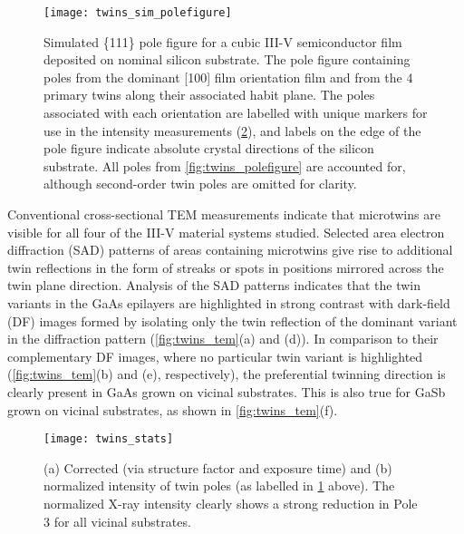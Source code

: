 \begin{figure}
    \centering
    \texttt{[image: twins\_sim\_polefigure]}
    \caption[Simulated pole figure of twinned III-V on nominal silicon]{\label{fig:twins_sim_polefigure}Simulated \{111\} pole figure for a cubic III-V semiconductor film deposited on nominal silicon substrate. The pole figure containing poles from the dominant [100] film orientation film and from the 4 primary twins along their associated habit plane. The poles associated with each orientation are labelled with unique markers for use in the intensity measurements (\cref{fig:twins_stats}), and labels on the edge of the pole figure indicate absolute crystal directions of the silicon substrate. All poles from \cref{fig:twins_polefigure} are accounted for, although second-order twin poles are omitted for clarity.}
\end{figure}
Conventional cross-sectional TEM measurements indicate that microtwins are visible for all four of the III-V material systems studied. Selected area electron diffraction (SAD) patterns of areas containing microtwins give rise to additional twin reflections in the form of streaks or spots in positions mirrored across the twin plane direction. Analysis of the SAD patterns indicates that the twin variants in the GaAs epilayers are highlighted in strong contrast with dark-field (DF) images formed by isolating only the twin reflection of the dominant variant in the diffraction pattern (\cref{fig:twins_tem}(a) and (d)). In comparison to their complementary DF images, where no particular twin variant is highlighted (\cref{fig:twins_tem}(b) and (e), respectively), the preferential twinning direction is clearly present in GaAs grown on vicinal substrates. This is also true for GaSb grown on vicinal substrates, as shown in \cref{fig:twins_tem}(f).
\begin{figure}
    \centering
    \texttt{[image: twins\_stats]}
    \caption[Integrated x-ray intensities from pole figures]{\label{fig:twins_stats}(a) Corrected (via structure factor and exposure time) and (b) normalized intensity of twin poles (as labelled in \cref{fig:twins_sim_polefigure} above). The normalized X-ray intensity clearly shows a strong reduction in Pole 3 for all vicinal substrates.}
\end{figure}
